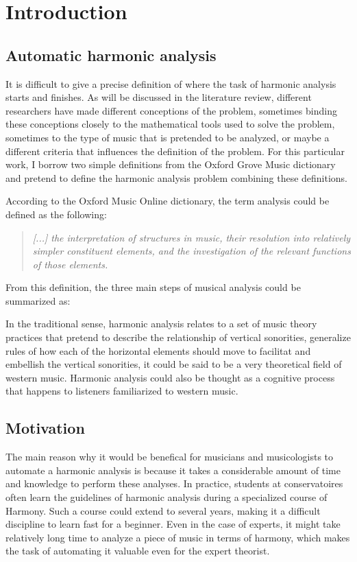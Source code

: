 \chapter{Introduction}

\section{Automatic harmonic analysis}
It is difficult to give a precise definition of where the task of harmonic analysis starts and finishes. As will be discussed in the literature review, different researchers have made different conceptions of the problem, sometimes binding these conceptions closely to the mathematical tools used to solve the problem, sometimes to the type of music that is pretended to be analyzed, or maybe a different criteria that influences the definition of the problem. For this particular work, I borrow two simple definitions from the Oxford Grove Music dictionary and pretend to define the harmonic analysis problem combining these definitions.

According to the Oxford Music Online dictionary, the term analysis could be defined as the following: \cite{oxfordanalysis}

\begin{quote}
\centering
\emph{[...] the interpretation of structures in music, \linebreak
their resolution into relatively simpler constituent elements, \linebreak and the investigation of the relevant functions of those elements.}
\end{quote}

From this definition, the three main steps of musical analysis could be summarized as:



In the traditional sense, harmonic analysis relates to a set of music theory practices that pretend to describe the relationship of vertical sonorities, generalize rules of how each of the horizontal elements should move to facilitat and embellish the vertical sonorities, it could be said to be a very theoretical field of western music. Harmonic analysis could also be thought as a cognitive process that happens to listeners familiarized to western music.

\section{Motivation}
The main reason why it would be benefical for musicians and musicologists to automate a harmonic analysis is because it takes a considerable amount of time and knowledge to perform these analyses. In practice, students at conservatoires often learn the guidelines of harmonic analysis during a specialized course of Harmony. Such a course could extend to several years, making it a difficult discipline to learn fast for a beginner. Even in the case of experts, it might take relatively long time to analyze a piece of music in terms of harmony, which makes the task of automating it valuable even for the expert theorist.

